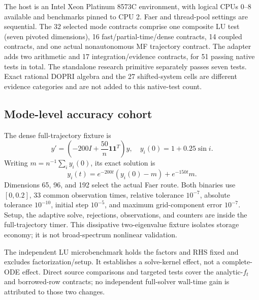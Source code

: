 \documentclass[aps,prd,reprint,amsmath,amssymb,longbibliography,nofootinbib]{revtex4-2}
\begin{document}
The host is an Intel Xeon Platinum 8573C environment, with logical CPUs 0--8
available and benchmarks pinned to CPU 2. Faer and thread-pool settings are
sequential. The 32 selected mode contracts comprise one composite LU test
(seven pivoted dimensions), 16 fast/partial-time/dense contracts, 14 coupled
contracts, and one actual nonautonomous MF trajectory contract. The adapter
adds two arithmetic and 17 integration/evidence contracts, for 51 passing
native tests in total. The standalone research primitive separately passes
seven tests. Exact rational DOPRI algebra and the 27 shifted-system cells are
different evidence categories and are not added to this native-test count.

\subsection{Mode-level accuracy cohort}
The dense full-trajectory fixture is
\begin{equation}
y'=\left(-200I+\frac{50}{n}\mathbf1\mathbf1^T\right)y,
\quad y_i(0)=1+0.25\sin i.
\end{equation}
Writing $m=n^{-1}\sum_i y_i(0)$, its exact solution is
\begin{equation}
y_i(t)=e^{-200t}(y_i(0)-m)+e^{-150t}m.
\end{equation}
Dimensions 65, 96, and 192 select the actual Faer route. Both binaries use $[0,0.2]$, 33 common observation times, relative tolerance $10^{-7}$, absolute tolerance $10^{-10}$, initial step $10^{-5}$, and maximum grid-component error $10^{-7}$. Setup, the adaptive solve, rejections, observations, and counters are inside the full-trajectory timer. This dissipative two-eigenvalue fixture isolates storage economy; it is not broad-spectrum nonlinear validation.

The independent LU microbenchmark holds the factors and RHS fixed and excludes factorization/setup. It establishes a solve-kernel effect, not a complete-ODE effect. Direct source comparisons and targeted tests cover the analytic-$f_t$ and borrowed-row contracts; no independent full-solver wall-time gain is attributed to those two changes.
\end{document}
